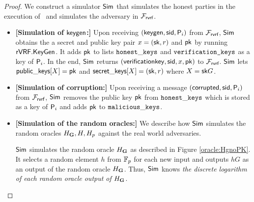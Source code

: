 \begin{proof}
	We construct a simulator $ \mathsf{Sim} $ that simulates the honest parties in the execution of \name \ and simulates the adversary in $ \mathcal{F}_{\textsf{rvrf}} $. 
	\begin{itemize}
		
		\item \textbf{[Simulation of $ \mathsf{keygen} $:]} Upon receiving $(\mathsf{keygen}, \textsf{sid}, \mathsf{P}_i)$ from $\mathcal{F}_{\textsf{rvrf}}$, $ \mathsf{Sim} $ obtains the a secret and public key pair $ x = (\mathsf{sk},r)$ and $\mathsf{pk} $ by running $ {\mathsf{rVRF}}.{\mathsf{KeyGen}} $. It adds $ \mathsf{pk} $ to lists $ \mathtt{honest\_keys} $ and $ \texttt{verification\_keys} $ as a key of $ \mathsf{P}_i $.
		In the end, $ \mathsf{Sim} $ returns $(\mathsf{verificationkey}, \textsf{sid}, x,\mathsf{pk})$ to $\mathcal{F}_{\textsf{rvrf}}$. 
	    $ \mathsf{Sim} $ lets $ {\mathsf{public\_keys}}[X] = \mathsf{pk}$ and $ {\mathsf{secret\_keys}}[X] =(\mathsf{sk},r) $ where $ X = \mathsf{sk} G $.
		
		\item \textbf{[Simulation of corruption:]} Upon receiving a message $ (\mathsf{corrupted}, \textsf{sid}, \mathsf{P}_i) $ from $ \mathcal{F}_{\textsf{rvrf}} $, $ \mathsf{Sim} $ removes the public key $ \mathsf{pk} $ from $ \mathtt{honest\_keys} $ which is stored as a key of $ \mathsf{P}_i $ and adds $ \mathsf{pk} $ to $ \mathtt{malicious\_keys} $.
		
		\item\textbf{[Simulation of the random oracles:]} We  describe how $ \mathsf{Sim} $ simulates the random oracles $ H_{\mathbf{G}}, H, H_p $ against the real world adversaries. 	
		
		$ \mathsf{Sim} $ simulates the random oracle $ H_{\mathbf{G}} $ as described in Figure \ref{oracle:HgnoPK}. It selects a random element  $ h $ from $ \mathbb{F}_p $ for each new input and outputs $ hG $ as an output of the random oracle $ H_{\mathbf{G}} $. Thus, $ \mathsf{Sim} $ knows \emph{the discrete logarithm of each random oracle output of $H_{\mathbf{G}}  $}. 



\end{itemize}
\end{proof}
